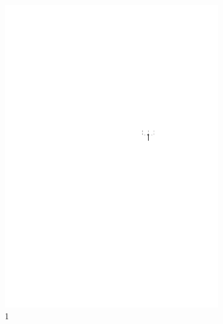 \documentclass{beamer}
\begin{document}
\begin{frame}
\begin{columns}[b]
\begin{column}{2cm}
\begin{figure}[h]
                \includegraphics[scale=.8]{oc3_embed/incoming/indeg1}
                \caption{1}
        \end{figure}
\end{column}
\begin{column}{2cm}
        \begin{figure}[h]
                \centering

\end{figure}
\end{column}
\end{columns}
\end{frame}
\end{document}
